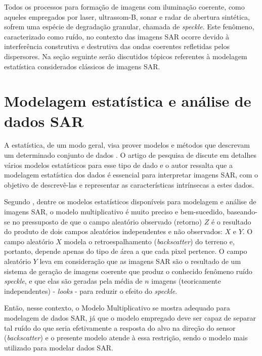 Todos os processos para formação de imagens com iluminação coerente, como aqueles empregados por laser, ultrassom-B, sonar e radar de abertura sintética, sofrem uma espécie de degradação granular, chamada de \textit{speckle}. Este fenômeno, caracterizado como ruído, no contexto das imagens SAR ocorre devido à interferência construtiva e destrutiva das ondas coerentes refletidas pelos dispersores. Na seção seguinte serão discutidos tópicos referentes à modelagem estatística considerados clássicos de imagens SAR.


\section{Modelagem estatística e análise de dados SAR}

A estatística, de um modo geral, visa prover modelos e métodos que descrevam um determinado conjunto de dados \citep{dissert_torres}. O artigo de pesquisa de \citet{Gao2010StatisticalMO} discute em detalhes vários modelos estatísticos para esse tipo de dado e o autor ressalta que a modelagem estatística dos dados é essencial para interpretar imagens SAR, com o objetivo de descrevê-las e representar as características intrínsecas a estes dados.

Segundo \citet{Mejail2002}, dentre os modelos estatísticos disponíveis para modelagem e análise de imagens SAR, o modelo multiplicativo é muito preciso e bem-sucedido, baseando-se no pressuposto de que o campo aleatório observado (retorno) $Z$ é o resultado do produto de dois campos aleatórios independentes e não observados: $X$ e $Y$. O campo aleatório $X$ modela o retroespalhamento (\textit{backscatter}) do terreno e, portanto, depende apenas do tipo de área a que cada pixel pertence. O campo aleatório $Y$ leva em consideração que as imagens SAR são o resultado de um sistema de geração de imagens coerente que produz o conhecido fenômeno ruído \textit{speckle}, e que elas são geradas pela média de $n$ imagens (teoricamente independentes) - \textit{looks} - para reduzir o efeito do \textit{speckle}.

Então, nesse contexto, o Modelo Multiplicativo se mostra adequado para modelagem de dados SAR, já que o modelo empregado  deve ser capaz de separar tal ruído do que seria efetivamente a resposta do alvo na direção do sensor (\textit{backscatter}) e o presente modelo atende à essa restrição, sendo o modelo mais utilizado para modelar dados SAR. 

